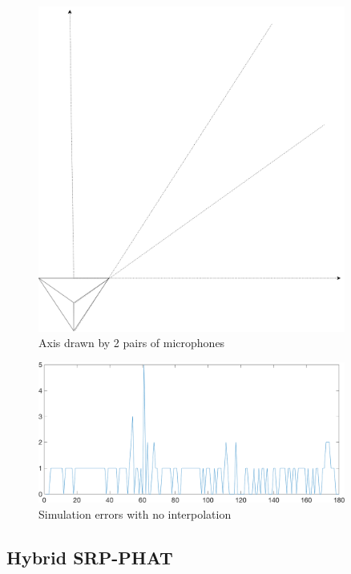 \begin{figure}[H]
    \centering
    \includegraphics[width=0.9\textwidth]{Figures/locerrors.png}
    \caption{Axis drawn by 2 pairs of microphones}
    \label{fig:locerrortetra}
\end{figure}

\begin{figure}[H]
    \centering
    \includegraphics[width=0.9\textwidth]{Figures/errorphinointerpolationandrounding.png}
    \caption{Simulation errors with no interpolation}
    \label{fig:errorsimulation1}
\end{figure}

\subsection{Hybrid SRP-PHAT}

